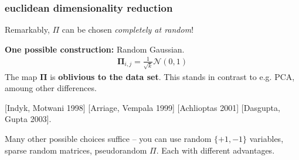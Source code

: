 \documentclass[compress]{beamer}
\newcommand{\bs}[1]{\boldsymbol{#1}}
\begin{document}
\begin{frame}
	\frametitle{euclidean dimensionality reduction}
	\begin{center}
		Remarkably, $\Pi$ can be chosen \emph{completely at random}!
	\end{center}
	\textbf{One possible construction:} Random Gaussian.
	\begin{align*}
		\bs{\Pi}_{i,j} = \frac{1}{\sqrt{k}} \mathcal{N}(0,1)
	\end{align*}
	The map $\bs{\Pi}$ is \textbf{\alert{oblivious to the data set}}. This stands in contrast to e.g. PCA, amoung other differences.
	
	[Indyk, Motwani 1998] [Arriage, Vempala 1999] [Achlioptas 2001] [Dasgupta, Gupta 2003].
	
	Many other possible choices suffice -- you can use random $\{+1,-1\}$ variables, sparse random matrices, pseudorandom $\Pi$. Each with different advantages. 
\end{frame}
\end{document}

